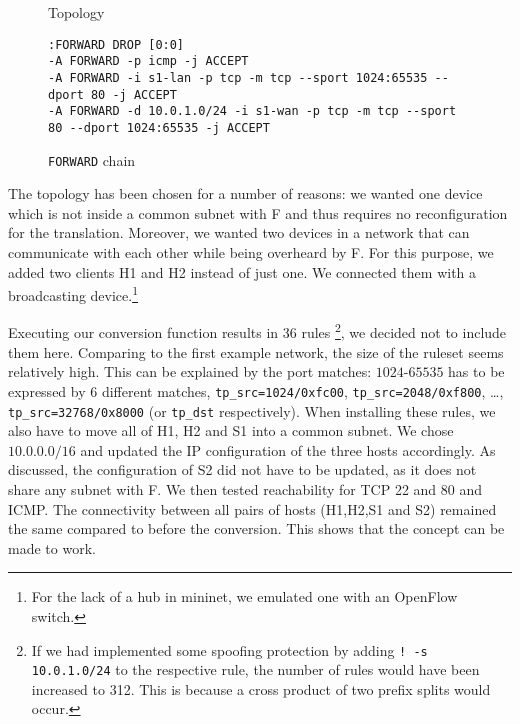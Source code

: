 \begin{figure*}
\centering
\begin{subfigure}{0.4\textwidth}
\vspace{1em}
\caption{Topology}
\label{fig:exn2}
\end{subfigure}
\hspace{0.05\textwidth}
\begin{subfigure}{0.5\textwidth}
\begin{lstlisting}
:FORWARD DROP [0:0]
-A FORWARD -p icmp -j ACCEPT
-A FORWARD -i s1-lan -p tcp -m tcp --sport 1024:65535 --dport 80 -j ACCEPT
-A FORWARD -d 10.0.1.0/24 -i s1-wan -p tcp -m tcp --sport 80 --dport 1024:65535 -j ACCEPT
\end{lstlisting}
\caption{\texttt{FORWARD} chain}
\label{fig:exn2fw}
\end{subfigure}
\caption{Example Network 2}
\end{figure*}

The topology  has been chosen for a number of reasons:
we wanted one device which is not inside a common subnet with F and thus requires no reconfiguration for the translation.
Moreover, we wanted two devices in a network that can communicate with each other while being overheard by F.
For this purpose, we added two clients H1 and H2 instead of just one.
We connected them with a broadcasting device.\footnote{For the lack of a hub in mininet, we emulated one with an OpenFlow switch.}

Executing our conversion function results in 36 rules%
	\footnote{If we had implemented some spoofing protection by adding \texttt{! -s 10.0.1.0/24} to the respective rule, the number of rules would have been increased to 312. This is because a cross product of two prefix splits would occur.},
we decided not to include them here.
Comparing to the first example network, the size of the ruleset seems relatively high. This can be explained by the port matches: $1024$-$65535$ has to be expressed by 6 different matches, \texttt{tp\_src=1024/0xfc00}, \texttt{tp\_src=2048/0xf800}, \ldots, \texttt{tp\_src=32768/0x8000} (or \texttt{tp\_dst} respectively).
When installing these rules, we also have to move all of H1, H2 and S1 into a common subnet.
We chose $10.0.0.0/16$ and updated the IP configuration of the three hosts accordingly.
As discussed, the configuration of S2 did not have to be updated, as it does not share any subnet with F.
We then tested reachability for TCP 22 and 80 and ICMP.
The connectivity between all pairs of hosts (H1,H2,S1 and S2) remained the same compared to before the conversion.
This shows that the concept can be made to work.

